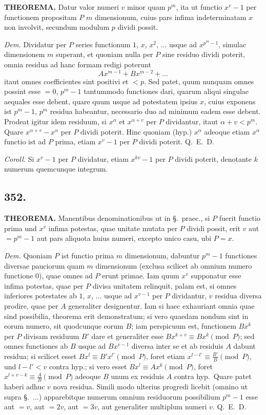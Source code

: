 \documentclass[12pt,a4paper]{article}
\newcommand{\Sec}{\S}
\begin{document}
\textbf{THEOREMA.} Datur valor numeri $v$ minor quam $p^m$, ita ut functio $x^v-1$ per functionem propositam $P$ $m$ dimensionum, cuius pars infima indeterminatam $x$ non involvit, secundum modulum $p$ dividi possit.

\textit{Dem.} Dividatur per $P$ series functionum $1$, $x$, $x^2$, $\ldots$ usque ad $x^{p^m-1}$, simulac dimensionem $m$ superant, et quoniam nulla per $P$ sine residuo dividi poterit, omnia residua ad hanc formam redigi poterunt
\[
Ax^{m-1} + Bx^{m-2} + \ldots
\]
itaut omnes coefficientes sint positivi et $<p$. Sed patet, quum nunquam omnes possint esse $=0$, $p^m-1$ tantummodo functiones dari, quarum aliqui singulae aequales esse debent, quare quum usque ad potestatem ipsius $x$, cuius exponens ist $p^m-1$, $p^m$ residua habeantur, necessario duo ad minimum eadem esse debent. Prodeat igitur idem residuum, si $x^\alpha$ et $x^{\alpha+v}$ per $P$ dividantur, itaut $\alpha+v<p^m$. Quare $x^{\alpha+v}-x^\alpha$ per $P$ dividi poterit. Hinc quoniam (hyp.) $x^\alpha$ adeoque etiam $x^\alpha$ functio ist ad $P$ prima, etiam $x^v-1$ per $P$ dividi poterit. Q.~E.~D.

\textit{Coroll.} Si $x^v-1$ per $P$ dividatur, etiam $x^{kv}-1$ per $P$ dividi poterit, denotante $k$ numerum quemcunque integrum.

\subsection*{352.}

\textbf{THEOREMA.} Manentibus denominationibus ut in \Sec.~praec., si $P$ fuerit functio prima und $x^v$ infima potestas, quae unitate mutata per $P$ dividi possit, erit $v$ aut $=p^m-1$ aut pars aliquota huius numeri, excepto unico casu, ubi $P=x$.

\textit{Dem.} Quoniam $P$ ist functio prima $m$ dimensionum, dabuntur $p^m-1$ functiones diversae pauciorum quam $m$ dimensionum (exclusa scilicet ab omnium numero functione $0$), quae omnes ad $P$ erunt primae. Iam quum $x^v$ supponatur esse infima potestas, quae per $P$ divisa unitatem relinquit, palam est, si omnes inferiores potestates ab $1$, $x$, $\ldots$ usque ad $x^{v-1}$ per $P$ dividantur, $v$ residua diversa prodire, quae per $A$ generaliter designentur. Iam si haec exhauriant omnia quae sind possibilia, theorema erit demonstratum; si vero quaedam nondum sint in eorum numero, sit quodcunque eorum $B$; iam perspicuum est, functionem $Bx^k$ per $P$ divisam residuum $B'$ dare et generaliter esse $Bx^{k+v}\equiv Bx^k\pmod{P}$; sed omnes functiones ab $B$ usque ad $Bx^{v-1}$ diversa inter se et ab residuis $A$ dabunt residua; si scilicet esset $Bx^l\equiv B'x^{l'}\pmod{P}$, foret etiam $x^{l-l'}\equiv \frac{B'}{B}\pmod{P}$, und $l-l'<v$ contra hyp.; si vero esset $Bx^l\equiv A x^k\pmod{P}$, foret $x^{l+v-k}\equiv \frac{A}{B}\pmod{P}$ adeoque $B$ unum ex residuis $A$ contra hyp.~Quare patet haberi adhuc $v$ nova residua. Simili modo ulterius progredi licebit (omnino ut supra \Sec.~$\ldots$) apparebitque numerum omnium residuorum possibilium $p^m-1$ esse aut $=v$, aut $=2v$, aut $=3v$, aut generaliter multiplum numeri $v$. Q.~E.~D.
\end{document}
